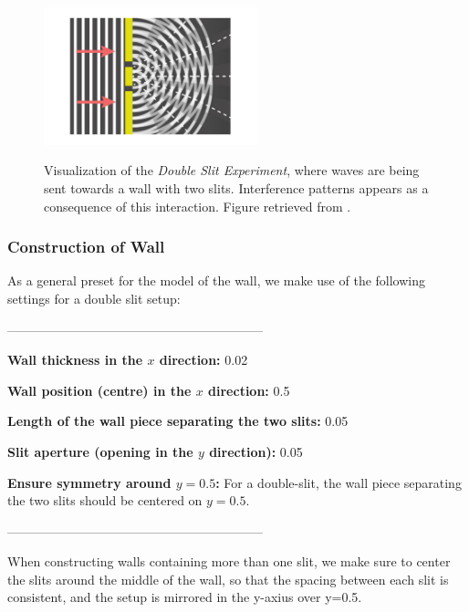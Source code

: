 \documentclass[10pt, nofootinbib, twocolumn]{revtex4-1}
\begin{document}
\begin{figure}[H]
    \caption{Visualization of the \textit{Double Slit Experiment}, where waves are being sent towards a wall with two slits. Interference patterns appears as a consequence of this interaction. Figure retrieved from \cite[p.~426]{oscillations}.}
    \centering
    \includegraphics[width = 0.55\textwidth]{figures/interference.pdf} 
    \label{fig:example}
\end{figure} 
\subsubsection{Construction of Wall}\label{sec:wall}
As a general preset for the model of the wall, we make use of the following settings for a double slit setup:
\begin{center} ------------------------------------------------------------ \end{center}
\begin{description}[]
    \item \textbf{Wall thickness in the $x$ direction:} 0.02
    \item \textbf{Wall position (centre) in the $x$ direction:} 0.5
    \item \textbf{Length of the wall piece separating the two slits:} 0.05
    \item \textbf{Slit aperture (opening in the $y$ direction):} 0.05 
    \item \textbf{Ensure symmetry around $y = 0.5$:} For a double-slit, the wall piece separating the two slits should be centered on $y = 0.5$.
\end{description}
\begin{center} ------------------------------------------------------------ \end{center}
When constructing walls containing more than one slit, we make sure to center the slits around the middle of the wall, so that the spacing between each slit is consistent, and the setup is mirrored in the y-axius over y=0.5.
\end{document}

